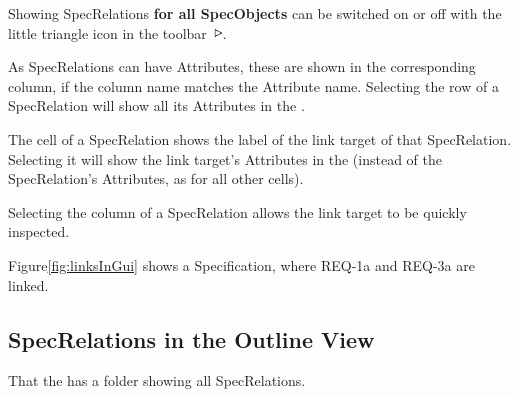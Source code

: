 Showing SpecRelations \textbf{for all SpecObjects} can be switched on or off with the little triangle icon in the toolbar \includegraphics[height=0.8em]{../rmf-images/icons/full/obj16/SpecRelation.png}.

As SpecRelations can have Attributes, these are shown in the corresponding column, if the column name matches the Attribute name.  Selecting the row of a SpecRelation will show all its Attributes in the .

The  cell of a SpecRelation shows the label of the link target of that SpecRelation.  Selecting it will show the link target's Attributes in the  (instead of the SpecRelation's Attributes, as for all other cells).

\begin{info}
Selecting the  column of a SpecRelation allows the link target to be quickly inspected.
\end{info}

Figure\ref{fig:linksInGui} shows a Specification, where REQ-1a and REQ-3a are linked.

\subsection{SpecRelations in the Outline View}

That the  has a folder showing all SpecRelations.

